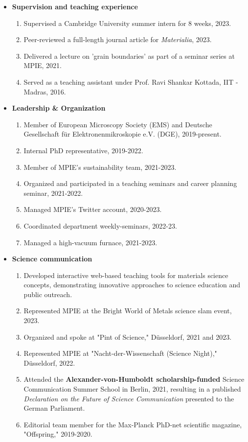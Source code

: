 \begin{itemize}
    \item[] \textbf{Supervision and teaching experience}
    \begin{enumerate}
        \item Supervised a Cambridge University summer intern for 8 weeks, 2023.
        \item Peer-reviewed a full-length journal article for \emph{Materialia}, 2023.
        \item Delivered a lecture on 'grain boundaries' as part of a seminar series at MPIE, 2021.
        \item Served as a teaching assistant under Prof. Ravi Shankar Kottada, IIT - Madras, 2016.
    \end{enumerate}    
    \item[] \textbf{Leadership \& Organization}
    \begin{enumerate}
        \item Member of European Microscopy Society (EMS) and Deutsche Gesellschaft für Elektronenmikroskopie e.V. (DGE), 2019-present.
        \item Internal PhD representative, 2019-2022.
        \item Member of MPIE's sustainability team, 2021-2023.
        \item Organized and participated in a teaching seminars and career planning seminar, 2021-2022.
        \item Managed MPIE's Twitter account, 2020-2023.
        \item Coordinated department weekly-seminars, 2022-23.
        \item Managed a high-vacuum furnace, 2021-2023.
    \end{enumerate}
    \item[] \textbf{Science communication}
    \begin{enumerate}
	\item Developed interactive web-based teaching tools for materials science concepts, demonstrating innovative approaches to science education and public outreach. 
        \item Represented MPIE at the Bright World of Metals science slam event, 2023.
        \item Organized and spoke at "Pint of Science," Düsseldorf, 2021 and 2023.
        \item Represented MPIE at "Nacht-der-Wissenschaft (Science Night)," Düsseldorf, 2022.
        \item Attended the \textbf{Alexander-von-Humboldt scholarship-funded} Science Communication Summer School in Berlin, 2021, resulting in a published \textit{Declaration on the Future of Science Communication} presented to the German Parliament.
        \item Editorial team member for the Max-Planck PhD-net scientific magazine, "Offspring," 2019-2020.
    \end{enumerate}
\end{itemize}